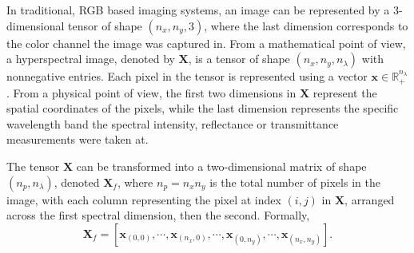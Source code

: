 In traditional, RGB based imaging systems, an image can be represented by a 3-dimensional tensor of shape $(n_x, n_y, 3)$, where the last dimension corresponds to the color channel the image was captured in. From a mathematical point of view, a hyperspectral image, denoted by $\mathbf{X}$, is a tensor of shape $(n_x, n_y, n_\lambda)$ with nonnegative entries. Each pixel in the tensor is represented using a vector $\mathbf{x} \in \mathbb{R}_+^{n_\lambda}$. From a physical point of view, the first two dimensions in $\mathbf{X}$ represent the spatial coordinates  of the pixels, while the last dimension represents the specific wavelength band the spectral intensity, reflectance or transmittance measurements were taken at.

The tensor $\mathbf{X}$ can be transformed into a two-dimensional matrix of shape $(n_p, n_\lambda)$, denoted $\mathbf{X}_f$, where $n_p = n_x n_y$ is the total number of pixels in the image, with each column representing the pixel at index $(i,j)$ in $\mathbf{X}$, arranged across the first spectral dimension, then the second. Formally, $$
\mathbf{X}_f = \left[ \mathbf{x}_{(0,0)},  \cdots, \mathbf{x}_{(n_x,0)}, \cdots, \mathbf{x}_{(0,n_y)}, \cdots, \mathbf{x}_{(n_x, n_y)} \right].
$$


